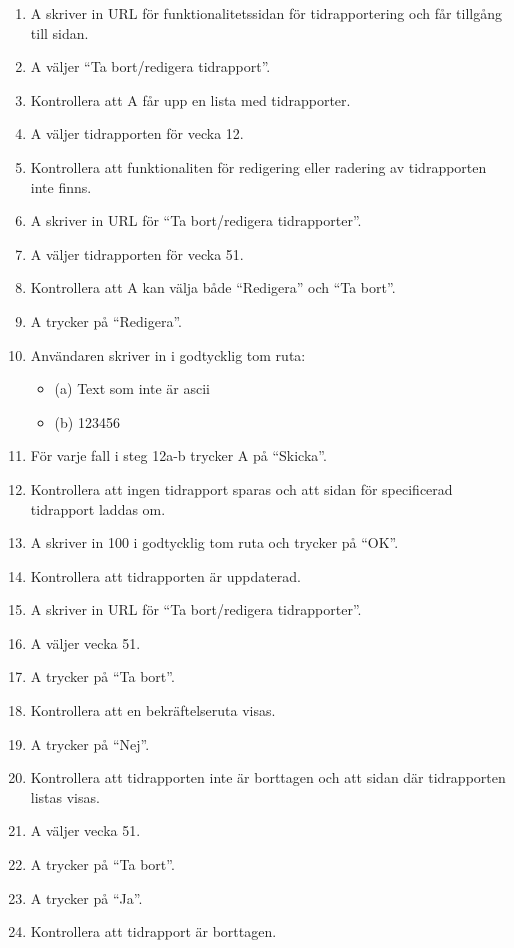 \documentclass[a4paper]{article}
\begin{document}
\begin{ST}
\begin{enumerate}
\item A skriver in URL för funktionalitetssidan för tidrapportering och får tillgång till sidan.
\item A väljer ``Ta bort/redigera tidrapport''.
\item Kontrollera att A får upp en lista med tidrapporter.
\item A väljer tidrapporten för vecka 12.
\item Kontrollera att funktionaliten för redigering eller radering av tidrapporten inte finns.
\item A skriver in URL för ``Ta bort/redigera tidrapporter''.
\item A väljer tidrapporten för vecka 51.
\item Kontrollera att A kan välja både ``Redigera'' och ``Ta bort''.
\item A trycker på ``Redigera''.
\item Användaren skriver in i godtycklig tom ruta:
\begin{itemize}
\item[] (a) Text som inte är ascii
\item[] (b) 123456
\end{itemize}
\item För varje fall i steg 12a-b trycker A på ``Skicka''. 
\item Kontrollera att ingen tidrapport sparas och att sidan för specificerad tidrapport laddas om.
\item A skriver in 100 i godtycklig tom ruta och trycker på ``OK''.
\item Kontrollera att tidrapporten är uppdaterad.
\item A skriver in URL för ``Ta bort/redigera tidrapporter''.
\item A väljer vecka 51.
\item A trycker på ``Ta bort''.
\item Kontrollera att en bekräftelseruta visas.
\item A trycker på ``Nej''.
\item Kontrollera att tidrapporten inte är borttagen och att sidan där tidrapporten listas visas.
\item A väljer vecka 51.
\item A trycker på ``Ta bort''.
\item A trycker på ``Ja''.
\item Kontrollera att tidrapport är borttagen.
\end{enumerate}


\end{ST}
\end{document}
